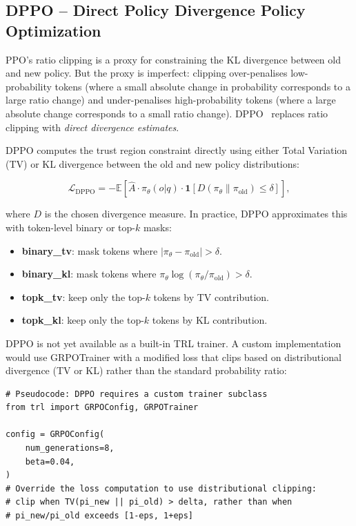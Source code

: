 \subsection{DPPO -- Direct Policy Divergence Policy Optimization}
\label{sec:dppo}

\begin{intuitionbox}
PPO’s ratio clipping is a proxy for constraining the KL divergence between old and new policy. But the proxy is imperfect: clipping over-penalises low-probability tokens (where a small absolute change in probability corresponds to a large ratio change) and under-penalises high-probability tokens (where a large absolute change corresponds to a small ratio change). DPPO~\cite{an2025dppo} replaces ratio clipping with \emph{direct divergence estimates}.
\end{intuitionbox}

DPPO computes the trust region constraint directly using either Total Variation (TV) or KL divergence between the old and new policy distributions:

\[
\mathcal{L}_{\text{DPPO}} = -\mathbb{E}\!\left[
    \hat{A} \cdot \pi_\theta(o|q) \cdot \mathbf{1}[D(\pi_\theta \| \pi_{\text{old}}) \le \delta]
  \right],
\]

where $D$ is the chosen divergence measure. In practice, DPPO approximates this with token-level binary or top-$k$ masks:

\begin{itemize}
  \item \textbf{binary\_tv}: mask tokens where $|\pi_\theta - \pi_{\text{old}}| > \delta$.
  \item \textbf{binary\_kl}: mask tokens where $\pi_\theta \log(\pi_\theta/\pi_{\text{old}}) > \delta$.
  \item \textbf{topk\_tv}: keep only the top-$k$ tokens by TV contribution.
  \item \textbf{topk\_kl}: keep only the top-$k$ tokens by KL contribution.
\end{itemize}

\begin{examplebox}
DPPO is not yet available as a built-in TRL trainer. A custom implementation would use GRPOTrainer with a modified loss that clips based on distributional divergence (TV or KL) rather than the standard probability ratio:

\begin{lstlisting}[style=pythonstyle]
# Pseudocode: DPPO requires a custom trainer subclass
from trl import GRPOConfig, GRPOTrainer

config = GRPOConfig(
    num_generations=8,
    beta=0.04,
)
# Override the loss computation to use distributional clipping:
# clip when TV(pi_new || pi_old) > delta, rather than when
# pi_new/pi_old exceeds [1-eps, 1+eps]
\end{lstlisting}
\end{examplebox}

